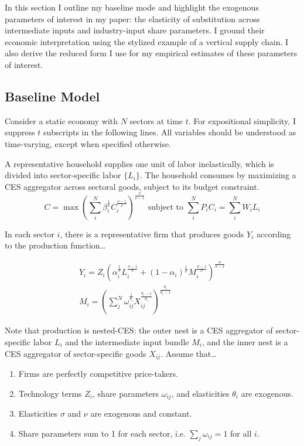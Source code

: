\documentclass[11pt]{article}
\begin{document}
In this section I outline my baseline mode and highlight the exogenous parameters of interest in my paper: the elasticity of substitution across intermediate inputs and industry-input share parameters. I ground their economic interpretation using the stylized example of a vertical supply chain. I also derive the reduced form I use for my empirical estimates of these parameters of interest. 

\subsection{Baseline Model}

Consider a static economy with $N$ sectors at time $t$. For expositional simplicity, I suppress $t$ subscripts in the following lines. All variables should be understood as time-varying, except when specified otherwise.

A representative household supplies one unit of labor inelastically, which is divided into sector-specific labor $\{L_i\}$. The household consumes by maximizing a CES aggregator across sectoral goods, subject to its budget constraint.  
\[
C = \max \left(\sum_i^N \beta_i^{\frac{1}{\nu}} C_i^{\frac{\nu-1}{\nu}}\right)^{\frac{\nu}{\nu-1}} \text{ subject to } \sum_i^N P_i C_i = \sum_i^N W_i L_i
\]

In each sector $i$, there is a representative firm that produces goods $Y_i$ according to the production function\dots

\[ 
\begin{aligned}
Y_i = Z_i \left(\alpha_i^{\frac{1}{\sigma}} L_i^{\frac{\sigma-1}{\sigma}} + (1-\alpha_i)^{\frac{1}{\sigma}} M_i^{\frac{\sigma - 1}{\sigma}} \right)^{\frac{\sigma}{\sigma-1}} \\
M_i = \left(\sum_j^N \omega_{ij}^{\frac{1}{\theta_i}} X_{ij}^{\frac{\theta_i-1}{\theta_i}} \right)^{\frac{\theta_i}{\theta_i-1}}
\end{aligned}
\]

Note that production is nested-CES: the outer nest is a CES aggregator of sector-specific labor $L_i$ and the intermediate input bundle $M_i$, and the inner nest is a CES aggregator of sector-specific goods $X_{ij}$. Assume that\dots

\begin{enumerate}[label=A.\arabic*]
\item Firms are perfectly competitive price-takers.
\item Technology terms $Z_i$, share parameters $\omega_{ij}$, and elasticities $\theta_i$ are exogenous. 
\item Elasticities $\sigma$ and $\nu$ are exogenous and constant. 
\item Share parameters sum to 1 for each sector, i.e. $\sum_j \omega_{ij} = 1$ for all $i$.
\end{enumerate}
\end{document}

